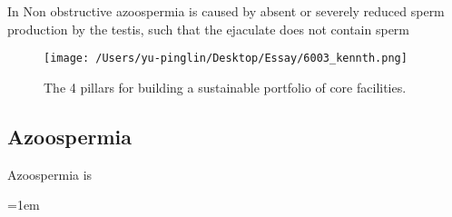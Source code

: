 \documentclass[12pt]{article}
\begin{document}
In Non obstructive azoospermia is caused by absent or severely reduced sperm production by the testis, such that the ejaculate does not contain sperm 







\begin{figure}[H]
    \texttt{[image: /Users/yu-pinglin/Desktop/Essay/6003\_kennth.png]}
    \centering
    \caption{The 4 pillars for building a sustainable portfolio of
    core facilities.}
\end{figure}

\subsection{Azoospermia}
Azoospermia is 






\emergencystretch=1em
\printbibliography[title=Reference]
\end{document}
